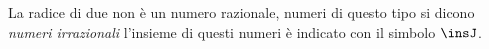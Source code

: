 
% 
% 

La radice di due non è un numero razionale, numeri di questo tipo si dicono 
\emph{numeri irrazionali} l'insieme di questi numeri è indicato con il 
simbolo \(\insJ\).

